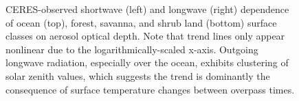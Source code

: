 \documentclass[12pt]{article}
\begin{document}
\begin{figure}[h!]
\begin{center}

        \end{center}
        \caption{CERES-observed shortwave (left) and longwave (right) dependence of ocean (top), forest, savanna, and shrub land (bottom) surface classes on aerosol optical depth. Note that trend lines only appear nonlinear due to the logarithmically-scaled x-axis. Outgoing longwave radiation, especially over the ocean, exhibits clustering of solar zenith values, which suggests the trend is dominantly the consequence of surface temperature changes between overpass times.}
        \label{oaod1}
    \end{figure}
\end{document}

